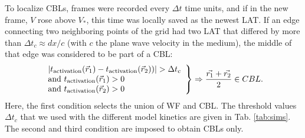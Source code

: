 \documentclass[aps,pre,amsfonts,amssymb,amsmath,twocolumn, superscriptaddress]{revtex4-1}
\newcommand{\tact}{\ensuremath{t_{\rm activation}}}
\newcommand{\VS}{V_*}
\begin{document}

To localize CBLs, frames were recorded every $\Delta t$ time units, and if in the new frame, $V$ rose above $\VS$, this time was locally saved as the newest LAT. If an edge connecting two neighboring points of the grid had two LAT that differed by more than $\Delta t_c \approx dx/c$ (with $c$ the plane wave velocity in the medium), the middle of that edge was considered to be part of a CBL: 
\begin{align}
\left. \begin{array}{l} 
| \tact(\vec{r}_1) - \tact(\vec{r}_2)) | > \Delta t_c  \\
\mathrm{and} \ \tact(\vec{r}_1) > 0 \\
\mathrm{and} \ \tact(\vec{r}_2) > 0 
\end{array} \right\}
\Rightarrow \frac{\vec{r_1} + \vec{r_2}}{2} \in CBL. \label{CBLdetection}
\end{align}
Here, the first condition selects the union of WF and CBL. The threshold values $\Delta t_c$ that we used with the different model kinetics are given in Tab. \ref{tab:sims}. The second and third condition are imposed to obtain CBLs only. 
\end{document}
